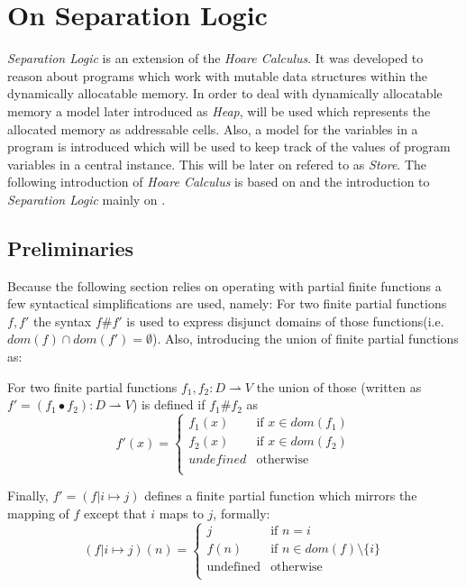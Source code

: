 \section{On Separation Logic}
	\emph{Separation Logic} is an extension of the \emph{Hoare Calculus}.
	It was developed to reason about programs which work with mutable data
	structures within the dynamically allocatable memory. In order to deal with
	dynamically allocatable memory a model later introduced as
	\emph{Heap}, will be used which represents the allocated memory as
	addressable cells. Also, a model for the variables in a program is
	introduced which will be used to keep track of the values of program
	variables in a central instance. This will be later on refered to as
	\emph{Store}. The following introduction of \emph{Hoare Calculus} is
	based on \cite{hoarecalc} and the introduction to \emph{Separation
	Logic} mainly on \cite{Primer}.

	\subsection{Preliminaries}
	Because the following section relies on operating with partial finite
	functions a few syntactical simplifications are used, namely:
	For two finite partial functions $f, f'$ the syntax $f \# f'$ is used
	to express disjunct domains of those functions(i.e.
	$\textit{dom}(f)\cap\textit{dom}(f') = \emptyset$). Also, introducing
	the union of finite partial functions as:
	\begin{mydef}
		For two finite partial functions $f_1, f_2 : D \rightharpoonup V$ the
		union of those (written as
		$f' = (f_1\bullet f_2) : D \rightharpoonup V$) is defined if $f_1 \# f_2$
		as
		$$
			f'(x) =
			\begin{cases}
				f_1(x)             &\text{if } x \in \textit{dom}(f_1)\\
				f_2(x)             &\text{if } x \in \textit{dom}(f_2)\\
				\textit{undefined} &\text{otherwise}\\
			\end{cases}
		$$
	\end{mydef}

	Finally, $f' = (f|i\mapsto j)$ defines a finite partial function
	which mirrors the mapping of $f$ except that $i$ maps to $j$, formally:
	$$(f|i\mapsto j) (n) =
		\begin{cases}
			j &\text{if } n = i\\
			f(n) &\text{if } n \in \textit{dom}(f)\setminus\{i\}\\
			\text{undefined} &\text{otherwise}\\
		\end{cases}
	$$

